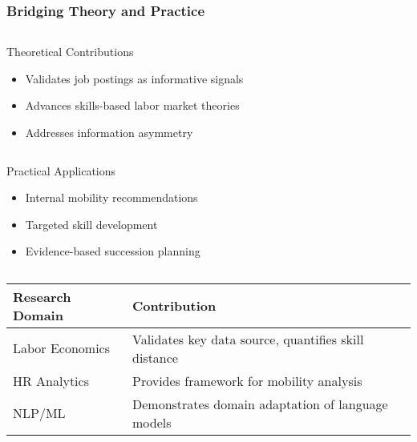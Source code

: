 \documentclass[aspectratio=169]{beamer}
\begin{document}
\begin{frame}
\frametitle{Bridging Theory and Practice}

\begin{comparison}
\begin{column}{0.48\textwidth}
\begin{block}{Theoretical Contributions}
\begin{itemize}
\item Validates job postings as informative signals
\item Advances skills-based labor market theories
\item Addresses information asymmetry
\end{itemize}
\end{block}
\end{column}

\begin{column}{0.48\textwidth}
\begin{block}{Practical Applications}
\begin{itemize}
\item Internal mobility recommendations
\item Targeted skill development
\item Evidence-based succession planning
\end{itemize}
\end{block}
\end{column}
\end{comparison}
\vspace{1em}

\begin{center}
\begin{tabular}{|l|l|}
\hline
\headrow
\textbf{Research Domain} & \textbf{Contribution} \\
\hline
Labor Economics & Validates key data source, quantifies skill distance \\
HR Analytics & Provides framework for mobility analysis \\
NLP/ML & Demonstrates domain adaptation of language models \\
\hline
\end{tabular}
\end{center}
\end{frame}
\end{document}
